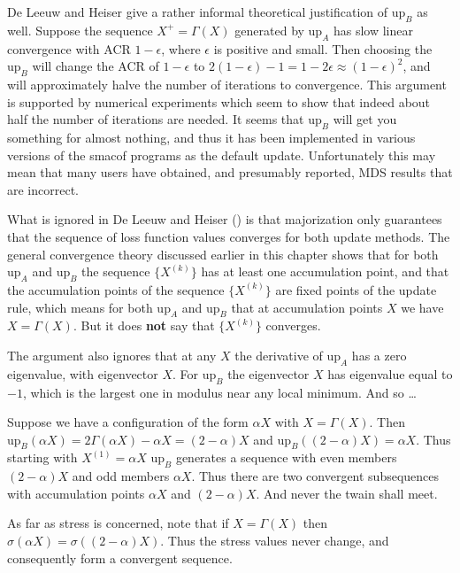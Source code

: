 \documentclass[
  12pt,
  letterpaper,
  DIV=11,
  numbers=noendperiod]{scrreprt}
\theoremstyle{remark}
\begin{document}
De Leeuw and Heiser give a rather informal theoretical justification of
\(\text{up}_B\) as well. Suppose the sequence \(X^+=\Gamma(X)\)
generated by \(\text{up}_A\) has slow linear convergence with ACR
\(1-\epsilon\), where \(\epsilon\) is positive and small. Then choosing
the \(\text{up}_B\) will change the ACR of \(1-\epsilon\) to
\(2(1-\epsilon)-1=1-2\epsilon\approx(1-\epsilon)^2\), and will
approximately halve the number of iterations to convergence. This
argument is supported by numerical experiments which seem to show that
indeed about half the number of iterations are needed. It seems that
\(\text{up}_B\) will get you something for almost nothing, and thus it
has been implemented in various versions of the smacof programs as the
default update. Unfortunately this may mean that many users have
obtained, and presumably reported, MDS results that are incorrect.

What is ignored in De Leeuw and Heiser
() is that majorization only
guarantees that the sequence of loss function values converges for both
update methods. The general convergence theory discussed earlier in this
chapter shows that for both \(\text{up}_A\) and \(\text{up}_B\) the
sequence \(\{X^{(k)}\}\) has at least one accumulation point, and that
the accumulation points of the sequence \(\{X^{(k)}\}\) are fixed points
of the update rule, which means for both \(\text{up}_A\) and
\(\text{up}_B\) that at accumulation points \(X\) we have
\(X=\Gamma(X)\). But it does \textbf{not} say that \(\{X^{(k)}\}\)
converges.

The argument also ignores that at any \(X\) the derivative of
\(\text{up}_A\) has a zero eigenvalue, with eigenvector \(X\). For
\(\text{up}_B\) the eigenvector \(X\) has eigenvalue equal to \(-1\),
which is the largest one in modulus near any local minimum. And so
\ldots{}

Suppose we have a configuration of the form \(\alpha X\) with
\(X=\Gamma(X)\). Then
\(\text{up}_B(\alpha X)=2\Gamma(\alpha X)-\alpha X=(2-\alpha)X\) and
\(\text{up}_B((2-\alpha)X)=\alpha X\). Thus starting with
\(X^{(1)}=\alpha X\) \(\text{up}_B\) generates a sequence with even
members \((2-\alpha)X\) and odd members \(\alpha X\). Thus there are two
convergent subsequences with accumulation points \(\alpha X\) and
\((2-\alpha)X\). And never the twain shall meet.

As far as stress is concerned, note that if \(X=\Gamma(X)\) then
\(\sigma(\alpha X)=\sigma((2-\alpha)X)\). Thus the stress values never
change, and consequently form a convergent sequence.
\end{document}
